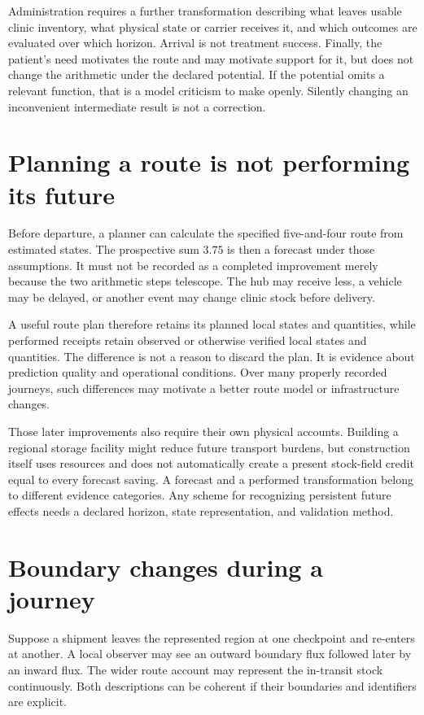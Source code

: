 Administration requires a further transformation describing what leaves usable clinic inventory, what physical state or carrier receives it, and which outcomes are evaluated over which horizon. Arrival is not treatment success. Finally, the patient's need motivates the route and may motivate support for it, but does not change the arithmetic under the declared potential. If the potential omits a relevant function, that is a model criticism to make openly. Silently changing an inconvenient intermediate result is not a correction.

\section{Planning a route is not performing its future}

Before departure, a planner can calculate the specified five-and-four route from estimated states. The prospective sum \(3.75\) is then a forecast under those assumptions. It must not be recorded as a completed improvement merely because the two arithmetic steps telescope. The hub may receive less, a vehicle may be delayed, or another event may change clinic stock before delivery.

A useful route plan therefore retains its planned local states and quantities, while performed receipts retain observed or otherwise verified local states and quantities. The difference is not a reason to discard the plan. It is evidence about prediction quality and operational conditions. Over many properly recorded journeys, such differences may motivate a better route model or infrastructure changes.

Those later improvements also require their own physical accounts. Building a regional storage facility might reduce future transport burdens, but construction itself uses resources and does not automatically create a present stock-field credit equal to every forecast saving. A forecast and a performed transformation belong to different evidence categories. Any scheme for recognizing persistent future effects needs a declared horizon, state representation, and validation method.

\section{Boundary changes during a journey}

Suppose a shipment leaves the represented region at one checkpoint and re-enters at another. A local observer may see an outward boundary flux followed later by an inward flux. The wider route account may represent the in-transit stock continuously. Both descriptions can be coherent if their boundaries and identifiers are explicit.

